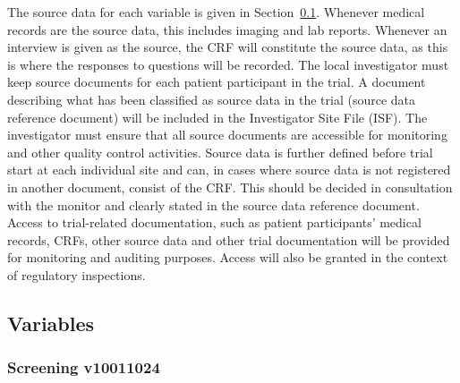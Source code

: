 \documentclass[
]{scrartcl}
\begin{document}
The source data for each variable is given in
Section~\ref{sec-variables}. Whenever medical records are the source
data, this includes imaging and lab reports. Whenever an interview is
given as the source, the CRF will constitute the source data, as this is
where the responses to questions will be recorded. The local
investigator must keep source documents for each patient participant in
the trial. A document describing what has been classified as source data
in the trial (source data reference document) will be included in the
Investigator Site File (ISF). The investigator must ensure that all
source documents are accessible for monitoring and other quality control
activities. Source data is further defined before trial start at each
individual site and can, in cases where source data is not registered in
another document, consist of the CRF. This should be decided in
consultation with the monitor and clearly stated in the source data
reference document. Access to trial-related documentation, such as
patient participants' medical records, CRFs, other source data and other
trial documentation will be provided for monitoring and auditing
purposes. Access will also be granted in the context of regulatory
inspections.

\hypertarget{sec-variables}{%
\subsection{Variables}\label{sec-variables}}

\hypertarget{screening-v10011024}{%
\subsubsection{Screening v10011024}\label{screening-v10011024}}
\end{document}
